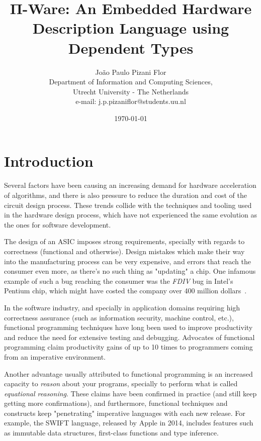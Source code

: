 \documentclass[a4paper,draft]{report}
\title{Π-Ware: An Embedded Hardware Description Language using Dependent Types}
\date{\today}
\author{
    João Paulo Pizani Flor \\
    Department of Information and Computing Sciences, \\
    Utrecht University - The Netherlands \\
    e-mail: j.p.pizaniflor@students.uu.nl
}
\begin{document}
    \maketitle


    \chapter{Introduction}
    \label{chap:intro}
        Several factors have been causing an increasing demand for hardware acceleration of algorithms,
        and there is also pressure to reduce the duration and cost of the circuit design process.
        These trends collide with the techniques and tooling used in the hardware design process,
        which have not experienced the same evolution as the ones for software development.

        The design of an \ac{ASIC} imposes strong requirements,
        specially with regards to correctness (functional and otherwise).
        Design mistakes which make their way into the manufacturing process can be very expensive,
        and errors that reach the consumer even more, as there's no such thing as "updating" a chip.
        One infamous example of such a bug reaching the consumer was the \emph{FDIV} bug in Intel's Pentium chip,
        which might have costed the company over 400 million dollars~\cite{intel-fdiv}.

        In the software industry, and specially
        in application domains requiring high correctness assurance (such as information security, machine control, etc.),
        functional programming techniques have long been used to improve productivity
        and reduce the need for extensive testing and debugging.
        Advocates of functional programming claim productivity gains of up to 10 times to
        programmers coming from an imperative environment.

        Another advantage usually attributed to functional programming is an increased capacity to
        \emph{reason} about your programs, specially to perform what is called \emph{equational reasoning}.
        These claims have been confirmed in practice (and still keep getting more confirmations),
        and furthermore, functional techniques and constructs keep "penetrating" imperative languages
        with each new release. For example, the SWIFT language, released by Apple in 2014,
        includes features such as immutable data structures, first-class functions and type inference.
\end{document}

